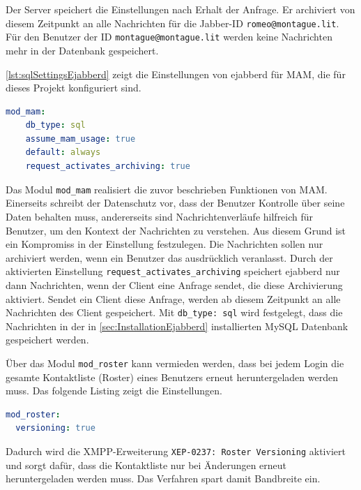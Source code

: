 \documentclass[a4paper,titlepage,halfparskip,12pt]{scrreprt}
\begin{document}
\begin{onehalfspacing}
Der Server speichert die Einstellungen nach Erhalt der Anfrage. Er archiviert von diesem Zeitpunkt an alle Nachrichten für die Jabber-ID \texttt{romeo@montague.lit}. Für den Benutzer der ID \texttt{montague@montague.lit} werden keine Nachrichten mehr in der Datenbank gespeichert.

\autoref{lst:sqlSettingsEjabberd} zeigt die Einstellungen von ejabberd für \ac{MAM}, die für dieses Projekt konfiguriert sind.

\bigskip

\begin{lstlisting}[language=yaml, caption={Konfiguration der Einstellungen für die Nachrichtenarchivierung}, label={lst:sqlSettingsEjabberd}]
mod_mam:
    db_type: sql
    assume_mam_usage: true
    default: always
    request_activates_archiving: true
\end{lstlisting}


Das Modul \texttt{mod\_mam} realisiert die zuvor beschrieben Funktionen von \ac{MAM}. Einerseits schreibt der Datenschutz vor, dass der Benutzer Kontrolle über seine Daten behalten muss, andererseits sind Nachrichtenverläufe hilfreich für Benutzer, um den Kontext der Nachrichten zu verstehen. Aus diesem Grund ist ein Kompromiss in der Einstellung festzulegen. Die Nachrichten sollen nur archiviert werden, wenn ein Benutzer das ausdrücklich veranlasst. Durch der aktivierten Einstellung \texttt{request\_activates\_archiving} speichert ejabberd nur dann Nachrichten, wenn der Client eine Anfrage sendet, die diese Archivierung aktiviert. Sendet ein Client diese Anfrage, werden ab diesem Zeitpunkt an alle Nachrichten des Client gespeichert. Mit \texttt{db\_type: sql} wird festgelegt, dass die Nachrichten in der in \autoref{sec:InstallationEjabberd} installierten MySQL Datenbank gespeichert werden.

Über das Modul \texttt{mod\_roster} kann vermieden werden, dass bei jedem Login die gesamte Kontaktliste (Roster) eines Benutzers erneut heruntergeladen werden muss. Das folgende Listing zeigt die Einstellungen.

\bigskip

\begin{lstlisting}[language=yaml, caption={Einstellungen des Moduls mod\_rosters}]
mod_roster:
  versioning: true
\end{lstlisting}

Dadurch wird die \ac{XMPP}-Erweiterung \texttt{XEP-0237: Roster Versioning} \cite{xep0237RosterVersioning} aktiviert und sorgt dafür, dass die Kontaktliste nur bei Änderungen erneut heruntergeladen werden muss. Das Verfahren spart damit Bandbreite ein.


\end{onehalfspacing}
\end{document}
